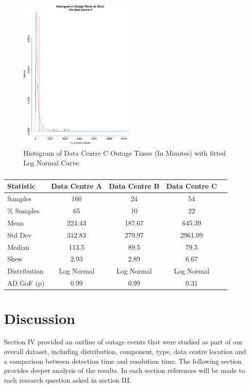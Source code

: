 \documentclass[conference]{IEEEtran}
\begin{document}
\begin{figure}
\begin{center}
\includegraphics[width=6cm]{graph13.pdf} 
\caption{ Histogram of  Data Centre C Outage Times (In Minutes) with fitted Log Normal Curve}
\end{center}
\label{fig:outagedistribution}
\end{figure}


\begin {table}
\caption {}
\begin{center}
\begin{tabular}{l*{3}{c}r} Statistic & Data Centre A & Data Centre B  & Data Centre C 
\\ \hline Samples & 160 & 24 & 54 
\\ \% Samples & 65 & 10 & 22
\\ Mean & 224.43	& 187.67	& 645.39
\\ Std Dev & 312.83	& 279.97	& 2961.09 
\\ Median & 113.5	& 89.5	& 79.5
\\ Skew & 2.93	& 2.89	& 6.67 
\\ Distribution & Log Normal & Log Normal & Log Normal  
\\AD GoF (p) & 0.99 & 0.99 & 0.31 
\end{tabular}
\end{center}
\end{table}






\section{Discussion}

Section IV provided an outline of outage events that were studied as part of our overall dataset, including distribution, component, type, data centre location and a comparison between detection time  and resolution time. The following section provides deeper analysis of the results. In each section references will be made to each research question asked in section III.
\end{document}
